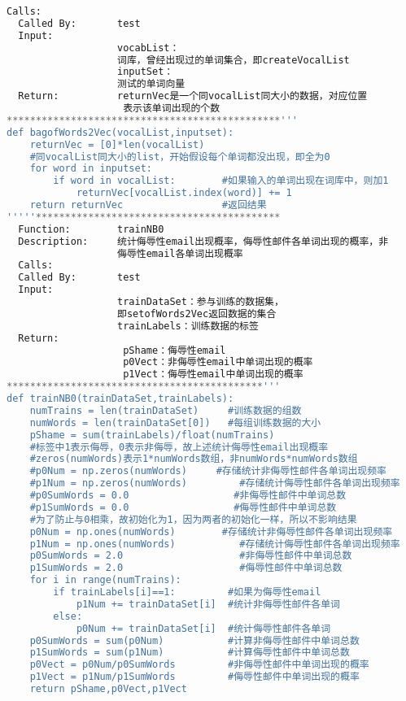 \begin{lstlisting}[language=python]
  Calls:            
  Called By:       test 
  Input: 
                   vocabList： 
                   词库，曾经出现过的单词集合，即createVocalList 
                   inputSet： 
                   测试的单词向量 
  Return:          returnVec是一个同vocalList同大小的数据，对应位置 
                    表示该单词出现的个数 
***********************************************'''  
def bagofWords2Vec(vocalList,inputset):  
    returnVec = [0]*len(vocalList)         
    #同vocalList同大小的list，开始假设每个单词都没出现，即全为0  
    for word in inputset:                                          
        if word in vocalList:        #如果输入的单词出现在词库中，则加1     
            returnVec[vocalList.index(word)] += 1  
    return returnVec                 #返回结果  
'''''****************************************** 
  Function:        trainNB0 
  Description:     统计侮辱性email出现概率，侮辱性邮件各单词出现的概率，非 
                   侮辱性email各单词出现概率 
  Calls:            
  Called By:       test 
  Input: 
                   trainDataSet：参与训练的数据集，
                   即setofWords2Vec返回数据的集合 
                   trainLabels：训练数据的标签 
  Return:           
                    pShame：侮辱性email 
                    p0Vect：非侮辱性email中单词出现的概率 
                    p1Vect：侮辱性email中单词出现的概率 
********************************************'''  
def trainNB0(trainDataSet,trainLabels):  
    numTrains = len(trainDataSet)     #训练数据的组数  
    numWords = len(trainDataSet[0])   #每组训练数据的大小  
    pShame = sum(trainLabels)/float(numTrains)  
    #标签中1表示侮辱，0表示非侮辱，故上述统计侮辱性email出现概率  
    #zeros(numWords)表示1*numWords数组，非numWords*numWords数组  
    #p0Num = np.zeros(numWords)     #存储统计非侮辱性邮件各单词出现频率  
    #p1Num = np.zeros(numWords)         #存储统计侮辱性邮件各单词出现频率  
    #p0SumWords = 0.0                  #非侮辱性邮件中单词总数  
    #p1SumWords = 0.0                  #侮辱性邮件中单词总数  
    #为了防止与0相乘，故初始化为1，因为两者的初始化一样，所以不影响结果  
    p0Num = np.ones(numWords)        #存储统计非侮辱性邮件各单词出现频率  
    p1Num = np.ones(numWords)           #存储统计侮辱性邮件各单词出现频率  
    p0SumWords = 2.0                    #非侮辱性邮件中单词总数  
    p1SumWords = 2.0                    #侮辱性邮件中单词总数  
    for i in range(numTrains):  
        if trainLabels[i]==1:         #如果为侮辱性email  
            p1Num += trainDataSet[i]  #统计非侮辱性邮件各单词  
        else:  
            p0Num += trainDataSet[i]  #统计侮辱性邮件各单词  
    p0SumWords = sum(p0Num)           #计算非侮辱性邮件中单词总数  
    p1SumWords = sum(p1Num)           #计算侮辱性邮件中单词总数  
    p0Vect = p0Num/p0SumWords         #非侮辱性邮件中单词出现的概率  
    p1Vect = p1Num/p1SumWords         #侮辱性邮件中单词出现的概率  
    return pShame,p0Vect,p1Vect  
      

\end{lstlisting}
